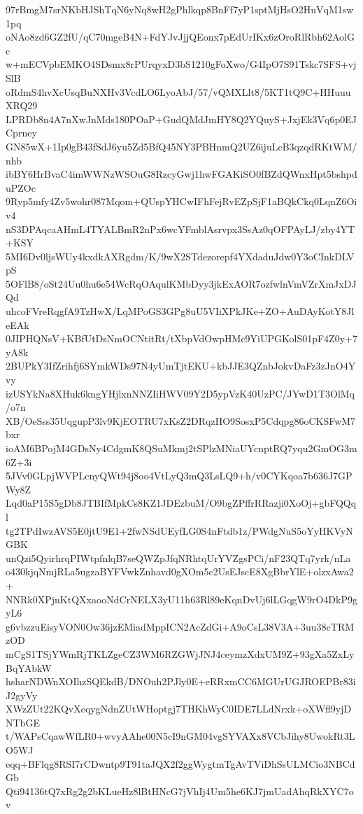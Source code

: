 97rBmgM7srNKbHJShTqN6yNq8wH2gPhlkqp8BnFf7yP1sptMjHsO2HuVqM1sw1pq
oNAo8zd6GZ2fU/qC70mgeB4N+FdYJvJjjQEonx7pEdUrIKx6zOroRlRbh62AolGc
w+mECVpbEMKO4SDsmx8rPUrqyxD3bS1210gFoXwo/G4IpO7S91Tskc7SFS+vjSlB
oRdmS4hvXcUsqBuNXHv3VcdLO6LyoAbJ/57/vQMXLlt8/5KT1tQ9C+HHuuuXRQ29
LPRDb8n4A7nXwJnMds180POaP+GudQMdJmHY8Q2YQuyS+JxjEk3Vq6p0EJCprney
GN85wX+1Ip0gB43fSdJ6yu5Zd5BfQ45NY3PBHnmQ2UZ6ijuLcB3qzqdRKtWM/nhb
ibBY6HrBvaC4imWWNzWSOuG8RzcyGwj1hwFGAKiSO0fBZdQWnxHpt5bshpduPZOc
9Ryp5mfy4Zv5wohr087Mqom+QUspYHCwIFhFejRvEZpSjF1aBQkCkq0LqnZ6Oiv4
nS3DPAqcaAHmL4TYALBmR2nPx6wcYFmblAsrvpx3SsAz0qOFPAyLJ/zby4YT+KSY
5MI6Dv0ljsWUy4kxdkAXRgdm/K/9wX2STdezorepf4YXdaduJdw0Y3oCInkDLVpS
5OFlB8/oSt24Uu0hu6e54WcRqOAqulKMbDyy3jkExAOR7ozfwlnVmVZrXmJxDJQd
uhcoFVreRqgfA9TzHwX/LqMPoGS3GPg8uU5VIiXPkJKe+ZO+AuDAyKotY8JleEAk
0JIPHQNsV+KBfUtDsNmOCNtitRt/tXbpVdOwpHMc9YiUPGKolS01pF4Z0y+7yA8k
2BUPkY3IfZrihfj6SYmkWDs97N4yUmTjtEKU+kbJJE3QZnbJokvDaFz3zJnO4Yvy
izUSYkNa8XHuk6kngYHjlxnNNZIiHWV09Y2D5ypVzK40UzPC/JYwD1T3OlMq/o7n
XB/OeSss35UqgupP3lv9KjEOTRU7xKsZ2DRqzHO9SosxP5Cdqpg86oCKSFwM7bxr
ioAM6BPojM4GDsNy4CdgmK8QSuMkmj2tSPlzMNiaUYcnptRQ7yqu2GmOG3m6Z+3i
5JVv0GLpjWVPLcnyQWt94j8oo4VtLyQ3mQ3LsLQ9+h/v0CYKqoa7b636J7GPWy8Z
Lqd0aP15S5gDb8JTBIfMpkCs8KZ1JDEzbuM/O9bgZPffrRRazji0XoOj+gbFQQql
tg2TPdIwzAVS5E0jtU9E1+2fwNSdUEyfLG0S4nFtdb1z/PWdgNuS5oYyHKVyNGBK
unQzi5QyirhrqPIWtpfnlqB7seQWZpJfqNRhtqUrYVZgsPCi/nF23QTq7yrk/nLa
o430kjqNmjRLa5ugzaBYFVwkZnhavd0gXOm5c2UsEJscE8XgBbrYlE+olzxAwa2+
NNRk0XPjnKtQXxaooNdCrNELX3yU11h63Rl89eKqnDvUj6lLGqgW9rO4DkP9gyL6
g6vbzzuEisyVON0Ow36jzEMiadMppICN2AcZdGi+A9oCsL38V3A+3uu38cTRMzOD
mCgS1TSjYWmRjTKLZgeCZ3WM6RZGWjJNJ4ceymzXdxUM9Z+93gXa5ZxLyBqYAbkW
hsharNDWnXOIhzSQEkdB/DNOuh2PJly0E+eRRxmCC6MGUrUGJROEPBr83iJ2gyVy
XWzZUt22KQvXeqygNdnZUtWHoptgj7THKhWyC0IDE7LLdNrxk+oXWfl9yjDNTbGE
t/WAPsCqawWfLR0+wvyAAhe00N5cI9nGM04vgSYVAXx8VCbJihy8UwokRt3LO5WJ
eqq+BFlqg8RSI7rCDwntp9T91taJQX2f2ggWygtmTgAvTViDhSsULMCio3NBCdGb
Qti94136tQ7xRg2g2bKLueHz8lBtHNcG7jVhIj4Um5he6KJ7jmUadAhqRkXYC7ov
